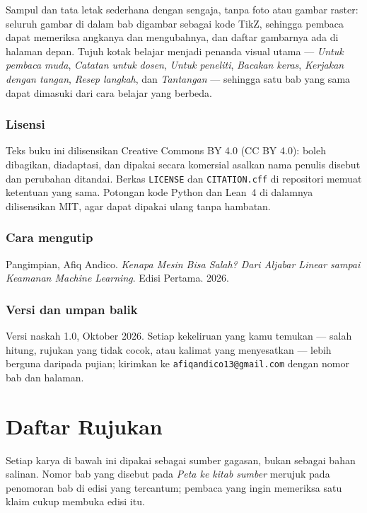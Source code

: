 \documentclass[11pt,a4paper,oneside]{book}
\theoremstyle{definition}
\theoremstyle{plain}
\theoremstyle{remark}
\begin{document}
Sampul dan tata letak sederhana dengan sengaja, tanpa foto atau gambar raster: seluruh
gambar di dalam bab digambar sebagai kode TikZ, sehingga pembaca dapat memeriksa
angkanya dan mengubahnya, dan daftar gambarnya ada di halaman depan. Tujuh kotak
belajar menjadi penanda visual utama --- \emph{Untuk pembaca muda}, \emph{Catatan untuk
dosen}, \emph{Untuk peneliti}, \emph{Bacakan keras}, \emph{Kerjakan dengan tangan},
\emph{Resep langkah}, dan \emph{Tantangan} --- sehingga satu bab yang sama dapat
dimasuki dari cara belajar yang berbeda.

\subsection*{Lisensi}
Teks buku ini dilisensikan Creative Commons BY 4.0 (CC BY 4.0): boleh dibagikan,
diadaptasi, dan dipakai secara komersial asalkan nama penulis disebut dan perubahan
ditandai. Berkas \texttt{LICENSE} dan \texttt{CITATION.cff} di repositori memuat ketentuan
yang sama. Potongan kode Python dan Lean~4 di dalamnya dilisensikan MIT, agar dapat dipakai
ulang tanpa hambatan.

\subsection*{Cara mengutip}
Pangimpian, Afiq Andico. \emph{Kenapa Mesin Bisa Salah? Dari Aljabar Linear sampai
Keamanan Machine Learning}. Edisi Pertama. 2026.

\subsection*{Versi dan umpan balik}
Versi naskah 1.0, Oktober 2026. Setiap kekeliruan yang kamu temukan --- salah hitung,
rujukan yang tidak cocok, atau kalimat yang menyesatkan --- lebih berguna daripada
pujian; kirimkan ke \texttt{afiqandico13@gmail.com} dengan nomor bab dan halaman.

\chapter*{Daftar Rujukan}

Setiap karya di bawah ini dipakai sebagai sumber gagasan, bukan sebagai bahan salinan.
Nomor bab yang disebut pada \emph{Peta ke kitab sumber} merujuk pada penomoran bab di
edisi yang tercantum; pembaca yang ingin memeriksa satu klaim cukup membuka edisi itu.
\end{document}
